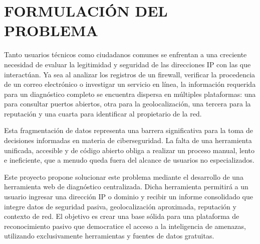 \section{FORMULACIÓN DEL PROBLEMA}

Tanto usuarios técnicos como ciudadanos comunes se enfrentan a una creciente necesidad de evaluar la legitimidad y seguridad de las direcciones IP con las que interactúan. Ya sea al analizar los registros de un firewall, verificar la procedencia de un correo electrónico o investigar un servicio en línea, la información requerida para un diagnóstico completo se encuentra dispersa en múltiples plataformas: una para consultar puertos abiertos, otra para la geolocalización, una tercera para la reputación y una cuarta para identificar al propietario de la red.

Esta fragmentación de datos representa una barrera significativa para la toma de decisiones informadas en materia de ciberseguridad. La falta de una herramienta unificada, accesible y de código abierto obliga a realizar un proceso manual, lento e ineficiente, que a menudo queda fuera del alcance de usuarios no especializados.

Este proyecto propone solucionar este problema mediante el desarrollo de una herramienta web de diagnóstico centralizada. Dicha herramienta permitirá a un usuario ingresar una dirección IP o dominio y recibir un informe consolidado que integre datos de seguridad pasiva, geolocalización aproximada, reputación y contexto de red. El objetivo es crear una base sólida para una plataforma de reconocimiento pasivo que democratice el acceso a la inteligencia de amenazas, utilizando exclusivamente herramientas y fuentes de datos gratuitas.